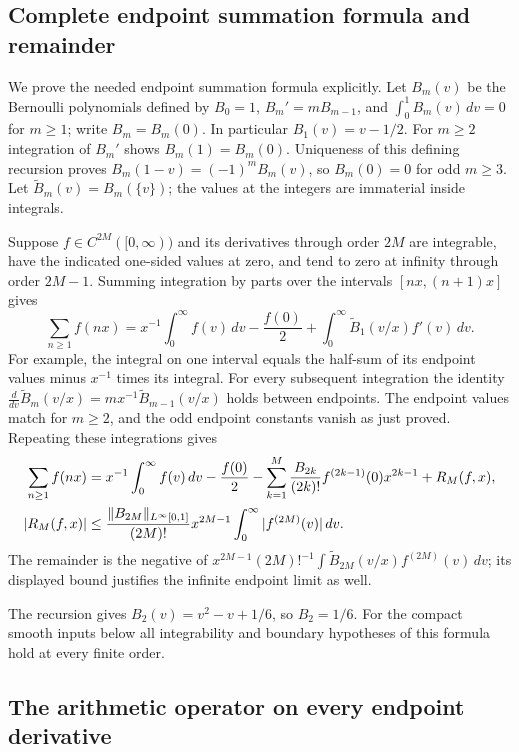 \subsection*{Complete endpoint summation formula and remainder}

We prove the needed endpoint summation formula explicitly. Let
\(B_m(v)\) be the Bernoulli polynomials defined by \(B_0=1\),
\(B_m'=mB_{m-1}\), and \(\int_0^1B_m(v)\,dv=0\) for \(m\ge1\);
write \(B_m=B_m(0)\). In particular \(B_1(v)=v-1/2\).
For \(m\ge2\) integration of \(B_m'\) shows \(B_m(1)=B_m(0)\).
Uniqueness of this defining recursion proves
\(B_m(1-v)=(-1)^mB_m(v)\), so \(B_m(0)=0\) for odd \(m\ge3\).
Let \(\widetilde B_m(v)=B_m(\{v\})\); the values at the integers
are immaterial inside integrals.

Suppose \(f\in C^{2M}([0,\infty))\) and its derivatives through order \(2M\) are integrable,
have the indicated one-sided values at zero, and tend to zero at infinity
through order \(2M-1\). Summing integration by parts over the intervals
\([nx,(n+1)x]\) gives
\[
 \sum_{n\ge1}f(nx)
 =x^{-1}\int_0^\infty f(v)\,dv-\frac{f(0)}2
       +\int_0^\infty\widetilde B_1(v/x)f'(v)\,dv .
\]
For example, the integral on one interval equals the half-sum of its
endpoint values minus \(x^{-1}\) times its integral. For every subsequent
integration the identity
\(\frac{d}{dv}\widetilde B_m(v/x)=
m x^{-1}\widetilde B_{m-1}(v/x)\) holds between endpoints.
The endpoint values match for \(m\ge2\), and the odd endpoint constants
vanish as just proved. Repeating these integrations gives
\begin{align}
 \sum_{n\ge1}f(nx)
 &=x^{-1}\int_0^\infty f(v)\,dv-\frac{f(0)}2
   -\sum_{k=1}^M\frac{B_{2k}}{(2k)!}
           f^{(2k-1)}(0)x^{2k-1}+R_M(f,x),\label{eq:nh-EM}\\
 |R_M(f,x)|&\le
 \frac{\|B_{2M}\|_{L^\infty[0,1]}}{(2M)!}
 x^{2M-1}\int_0^\infty|f^{(2M)}(v)|\,dv .\notag
\end{align}
The remainder is the negative of
\(x^{2M-1}(2M)!^{-1}\int\widetilde B_{2M}(v/x)f^{(2M)}(v)\,dv\);
its displayed bound justifies the infinite endpoint limit as well.


The recursion gives \(B_2(v)=v^2-v+1/6\), so \(B_2=1/6\).
For the compact smooth inputs below all integrability and boundary
hypotheses of this formula hold at every finite order.

\subsection*{The arithmetic operator on every endpoint derivative}


